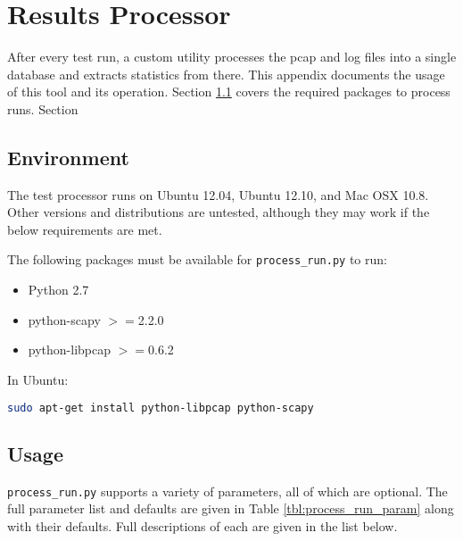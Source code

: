 \chapter{Results Processor}
\label{chp:processor}

\par After every test run, a custom utility processes the pcap and log files into a single database and extracts statistics from there. This appendix documents the usage of this tool and its operation. Section \ref{sec:proc_env} covers the required packages to process runs. Section 

\section{Environment}
\label{sec:proc_env}
\par The test processor runs on Ubuntu 12.04, Ubuntu 12.10, and Mac OSX 10.8. Other versions and distributions are untested, although they may work if the below requirements are met. 

\par The following packages must be available for \texttt{process\_run.py} to run:
{\singlespace
\begin{itemize}
\item Python 2.7
\item python-scapy $>=$2.2.0
\item python-libpcap $>=$0.6.2
\end{itemize}
}

\par In Ubuntu:
\begin{lstlisting}[language=bash]
sudo apt-get install python-libpcap python-scapy
\end{lstlisting}

\section{Usage}
\par \texttt{process\_run.py} supports a variety of parameters, all of which are optional. The full parameter list and defaults are given in Table \ref{tbl:process_run_param} along with their defaults. Full descriptions of each are given in the list below.

